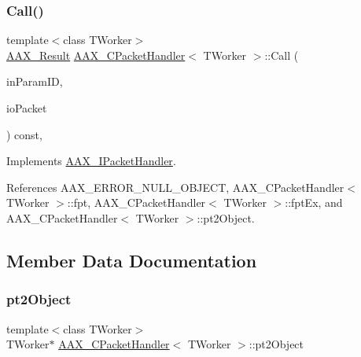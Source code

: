 \subsubsection{\texorpdfstring{Call()}{Call()}}
{\footnotesize\ttfamily template$<$class T\+Worker$>$ \\
\mbox{\hyperlink{a00392_a4d8f69a697df7f70c3a8e9b8ee130d2f}{A\+A\+X\+\_\+\+Result}} \mbox{\hyperlink{a01525}{A\+A\+X\+\_\+\+C\+Packet\+Handler}}$<$ T\+Worker $>$\+::Call (\begin{DoxyParamCaption}\item[{\mbox{\hyperlink{a00392_a1440c756fe5cb158b78193b2fc1780d1}{A\+A\+X\+\_\+\+C\+Param\+ID}}}]{in\+Param\+ID,  }\item[{\mbox{\hyperlink{a01513}{A\+A\+X\+\_\+\+C\+Packet}} \&}]{io\+Packet }\end{DoxyParamCaption}) const\hspace{0.3cm}{\ttfamily [inline]}, {\ttfamily [virtual]}}



Implements \mbox{\hyperlink{a01521_ab7b07bf6eb7f8f33ee3174ad54716de1}{A\+A\+X\+\_\+\+I\+Packet\+Handler}}.



References A\+A\+X\+\_\+\+E\+R\+R\+O\+R\+\_\+\+N\+U\+L\+L\+\_\+\+O\+B\+J\+E\+CT, A\+A\+X\+\_\+\+C\+Packet\+Handler$<$ T\+Worker $>$\+::fpt, A\+A\+X\+\_\+\+C\+Packet\+Handler$<$ T\+Worker $>$\+::fpt\+Ex, and A\+A\+X\+\_\+\+C\+Packet\+Handler$<$ T\+Worker $>$\+::pt2\+Object.



\subsection{Member Data Documentation}
\mbox{\label{a01525_ab9a5f88d1159060f5532aafb730dd861}} 
\subsubsection{\texorpdfstring{pt2Object}{pt2Object}}
{\footnotesize\ttfamily template$<$class T\+Worker$>$ \\
T\+Worker$\ast$ \mbox{\hyperlink{a01525}{A\+A\+X\+\_\+\+C\+Packet\+Handler}}$<$ T\+Worker $>$\+::pt2\+Object\hspace{0.3cm}{\ttfamily [protected]}}



